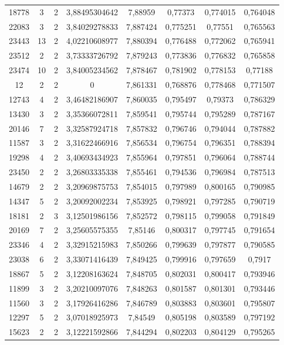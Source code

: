 \begin{longtable}{|c|c|c|c|c|c|c|c|}
18778 & 3 & 2 & 3,88495304642 & 7,88959 & 0,77373 & 0,774015 & 0,764048 \\
22083 & 3 & 2 & 3,84029278833 & 7,887424 & 0,775251 & 0,77551 & 0,765563 \\
23443 & 13 & 2 & 4,02210608977 & 7,880394 & 0,776488 & 0,772062 & 0,765941 \\
23512 & 2 & 2 & 3,73333726792 & 7,879243 & 0,773836 & 0,776832 & 0,765858 \\
23474 & 10 & 2 & 3,84005234562 & 7,878467 & 0,781902 & 0,778153 & 0,77188 \\
12 & 2 & 2 & 0 & 7,861331 & 0,768876 & 0,778468 & 0,771507 \\
12743 & 4 & 2 & 3,46482186907 & 7,860035 & 0,795497 & 0,79373 & 0,786329 \\
13430 & 3 & 2 & 3,35366072811 & 7,859541 & 0,795744 & 0,795289 & 0,787167 \\
20146 & 7 & 2 & 3,32587924718 & 7,857832 & 0,796746 & 0,794044 & 0,787882 \\
11587 & 3 & 2 & 3,31622466916 & 7,856534 & 0,796754 & 0,796351 & 0,788394 \\
19298 & 4 & 2 & 3,40693434923 & 7,855964 & 0,797851 & 0,796064 & 0,788744 \\
23450 & 2 & 2 & 3,26803335338 & 7,855461 & 0,794536 & 0,796984 & 0,787513 \\
14679 & 2 & 2 & 3,20969875753 & 7,854015 & 0,797989 & 0,800165 & 0,790985 \\
14347 & 5 & 2 & 3,20092002234 & 7,853925 & 0,798921 & 0,797285 & 0,790719 \\
18181 & 2 & 3 & 3,12501986156 & 7,852572 & 0,798115 & 0,799058 & 0,791849 \\
20169 & 7 & 2 & 3,25605575355 & 7,85146 & 0,800317 & 0,797745 & 0,791654 \\
23346 & 4 & 2 & 3,32915215983 & 7,850266 & 0,799639 & 0,797877 & 0,790585 \\
23038 & 6 & 2 & 3,33071416439 & 7,849425 & 0,799916 & 0,797659 & 0,7917 \\
18867 & 5 & 2 & 3,12208163624 & 7,848705 & 0,802031 & 0,800417 & 0,793946 \\
11899 & 3 & 2 & 3,20210097076 & 7,848263 & 0,801587 & 0,801301 & 0,793446 \\
11560 & 3 & 2 & 3,17926416286 & 7,846789 & 0,803883 & 0,803601 & 0,795807 \\
12297 & 5 & 2 & 3,07018925973 & 7,84549 & 0,805198 & 0,803589 & 0,797192 \\
15623 & 2 & 2 & 3,12221592866 & 7,844294 & 0,802203 & 0,804129 & 0,795265 \\

\end{longtable}
